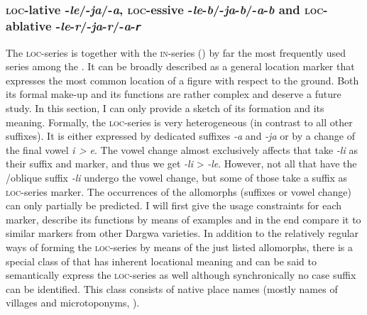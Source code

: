 
\subsubsection{\textsc{loc}-lative -\textit{le}/-\textit{ja}/-\textit{a}, \textsc{loc}-essive -\textit{le}-\textit{b}/-\textit{ja}-\textit{b}/-\textit{a}-\textit{b} and \textsc{loc}-ablative -\textit{le}-\textit{r}/-\textit{ja}-\textit{r}/-\textit{a}-\textit{\texttt{r}}}
\label{sssec:spr-lative -le/-ja/-a, spr-essive -le-b/-ja-b/-a-b and spr-ablative -le-r/-ja-r/-a-r} 

The \textsc{loc}-series is together with the \textsc{in}-series () by far the most frequently used series among the . It can be broadly described as a general location marker that expresses the most common location of a figure with respect to the ground. Both its formal make-up and its functions are rather complex and deserve a future study. In this section, I can only provide a sketch of its formation and its meaning. Formally, the \textsc{loc}-series is very heterogeneous (in contrast to all other  suffixes). It is either expressed by dedicated suffixes \textit{-a} and \textit{-ja} or by a change of the final vowel \textit{i > e}. The vowel change almost exclusively affects  that take \textit{-li} as their  suffix and  marker, and thus we get \textit{-li} > \textit{-le}. However, not all  that have the \slash oblique suffix \textit{-li} undergo the vowel change, but some of those  take a suffix as \textsc{loc}-series marker. The occurrences of the allomorphs (suffixes or vowel change) can only partially be predicted. I will first give the usage constraints for each marker, describe its functions by means of examples and in the end compare it to similar markers from other Dargwa varieties. In addition to the relatively regular ways of forming the \textsc{loc}-series by means of the just listed allomorphs, there is a special class of  that has inherent locational meaning and can be said to semantically express the \textsc{loc}-series as well although synchronically no case suffix can be identified. This class consists of native place names (mostly names of villages and microtoponyms, ).

